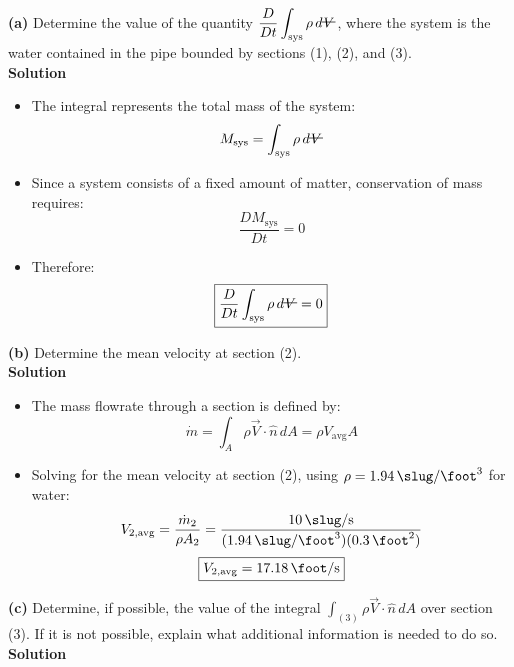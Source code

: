 ﻿\documentclass[12pt]{article}
\newcommand{\vol}{\mathord{\text{\ooalign{\hidewidth $V$\hidewidth\cr\kern-0.5pt\raisebox{0.8ex}{\rule[0pt]{1em}{0.5pt}}}}}}
\begin{document}
\textbf{(a)} Determine the value of the quantity $\displaystyle\frac{D}{Dt}\int_{\mathrm{sys}}\rho\,d\vol$, where the system is the water contained in the pipe bounded by sections (1), (2), and (3).\\
\textbf{Solution}
\begin{itemize}
    \item The integral represents the total mass of the system:
    \[M_{\mathrm{sys}}=\int_{\mathrm{sys}}\rho\,d\vol\]
    \item Since a system consists of a fixed amount of matter, conservation of mass requires:
    \[\frac{DM_{\mathrm{sys}}}{Dt}=0\]
    \item Therefore:
    \[\boxed{\frac{D}{Dt}\int_{\mathrm{sys}}\rho\,d\vol=0}\]
\end{itemize}
\textbf{(b)} Determine the mean velocity at section (2).\\
\textbf{Solution}
\begin{itemize}
    \item The mass flowrate through a section is defined by:
    \[\dot{m}=\int_A\rho\vec{V}\cdot\hat{n}\,dA=\rho V_{\mathrm{avg}}A\]
    \item Solving for the mean velocity at section (2), using $\rho=\SI{1.94}{\slug\per\foot\cubed}$ for water:
    \[V_{2,\mathrm{avg}}=\frac{\dot{m}_2}{\rho A_2}=\frac{\SI{10}{\slug\per\second}}{(\SI{1.94}{\slug\per\foot\cubed})(\SI{0.3}{\foot\squared})}\]
    \[\boxed{V_{2,\mathrm{avg}}=\SI{17.18}{\foot\per\second}}\]
\end{itemize}
\textbf{(c)} Determine, if possible, the value of the integral $\displaystyle\int_{(3)}\rho\vec{V}\cdot\hat{n}\,dA$ over section (3). If it is not possible, explain what additional information is needed to do so.\\
\textbf{Solution}
\end{document}
